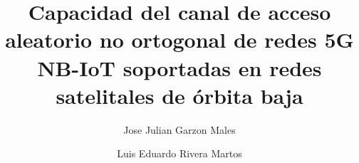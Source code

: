 \documentclass[12pt, oneside, letterpaper]{report}
\title{Capacidad del canal de acceso aleatorio no ortogonal de redes 5G NB-IoT
       soportadas en redes satelitales de órbita baja}
\author{Jose Julian Garzon Males \and Luis Eduardo Rivera Martos}
\date{}
\begin{document}
\nocite{ref1,ref2,ref3,ref4,ref5,ref6,ref7,ref8,ref9,ref10,
ref11,ref12,ref13,ref14,ref15,ref16,ref17,ref18,ref19,ref20,
ref21,ref22,ref23,ref24,ref25,ref29,ref30,ref31,ref32,ref33,
ref34,ref35,ref36,ref37}
\maketitleque 
\tableofcontents
\listoffigures
\listoftables

\newpage








\cleardoublepage
{}
{}


\end{document}
